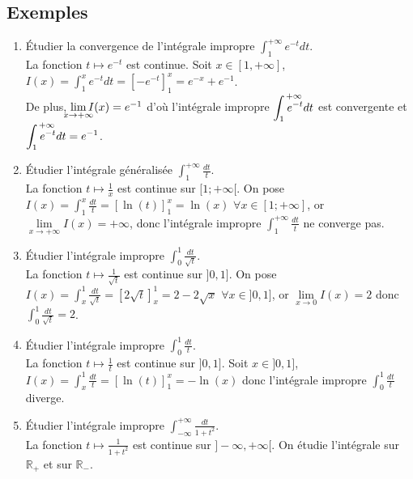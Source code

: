 \documentclass[a4paper,10pt]{book} %
\newcommand{\R}{\mathbb{R}}
\newcommand{\displayAmath}{\displaystyle}
\begin{document}
\subsection{Exemples}
\begin{enumerate}
\item Étudier la convergence de l'intégrale impropre $\displayAmath \int_1^{+\infty}e^{-t}dt$.\\
La fonction $t\mapsto e^{-t}$ est continue. Soit $x\in[1,+\infty]$, $I(x)=\displayAmath\int_{1}^{x}e^{-t}dt=[-e^{-t}]_1^x=e^{-x}+e^{-1}$.\\
De plus, $\lim\limits_{\mathclap{x\rightarrow +\infty}}I(x)=e^{-1}$ d'où l'intégrale impropre $\displayAmath \int_1^{\mathclap{~~~~~+\infty}}e^{-t}dt$ est convergente et $\displayAmath \int_1^{\mathclap{~~~~~+\infty}} e^{-t}dt=e^{-1}$.

\smallskip

\item Étudier l'intégrale généralisée $\displayAmath \int_1^{+\infty}\frac{dt}{t}$.\\
La fonction $t\mapsto \frac{1}{x}$ est continue sur $[1;+\infty[$. On pose $I(x)=\displayAmath\int_1^x\frac{dt}{t}=[\ln(t)]_1^x=\ln(x)$ $\forall x\in [1;+\infty]$, or $\lim\limits_{x\rightarrow +\infty}I(x)=+\infty$, donc l'intégrale impropre $\displayAmath\int_1^{+\infty}\frac{dt}{t}$ ne converge pas.

\smallskip

\item Étudier l’intégrale impropre $\displayAmath\int_0^1\frac{dt}{\sqrt{t}}$.\\
La fonction $t\mapsto \frac{1}{\sqrt{t}}$ est continue sur $]0,1]$.
On pose $I(x)=\displayAmath\int_x^1\frac{dt}{\sqrt{t}}=[2\sqrt{t}]_x^1=2-2\sqrt{x}$ $\forall x\in ]0,1]$, or $\lim\limits_{x\rightarrow 0}I(x)=2$ donc $\displayAmath\int_0^1\frac{dt}{\sqrt{t}}=2$.

\smallskip

\item Étudier l'intégrale impropre $\displayAmath\int_0^1\frac{dt}{t}$.\\
La fonction $t\mapsto \frac{1}{t}$ est continue sur $]0,1]$. Soit $x\in ]0,1]$, $I(x)=\displayAmath\int_x^1\frac{dt}{t}=[\ln(t)]_1^x=-\ln(x)$ donc l'intégrale impropre $\displayAmath\int_0^1\frac{dt}{t}$ diverge.

\smallskip

\item Étudier l'intégrale impropre $\displayAmath\int_{-\infty}^{+\infty}\frac{dt}{1+t^2}$.\\
La fonction $t\mapsto \frac{1}{1+t^2}$ est continue sur $]-\infty,+\infty[$.
On étudie l'intégrale sur $\R_+$ et sur $\R_-$.


\end{enumerate}
\end{document}
